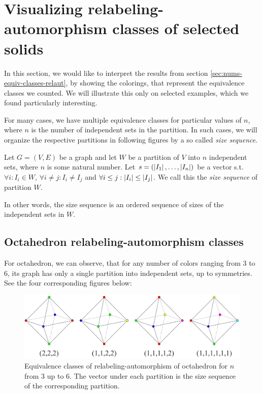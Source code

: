 \section{Visualizing relabeling-automorphism classes of selected solids}\label{sec:relaut-classes-visualisations}

In this section, we would like to interpret the results from section \ref{sec:nums-equiv-classes-relaut}, by showing the colorings, that represent the equivalence classes we counted. We will illustrate this only on selected examples, which we found particularly interesting.

For many cases, we have multiple equivalence classes for particular values of $n$, where $n$ is the number of independent sets in the partition. In such cases, we will organize the respective partitions in following figures by a so called \textit{size sequence}.

\begin{defn}
    Let $G=(V,E)$ be a graph and let $W$ be a partition of $V$ into $n$ independent sets, where $n$ is some natural number. Let $s=(\left|{I_1}\right|, \ldots, \left|{I_n}\right|)$ be a vector s.t. $\forall i: I_i \in W$, $\forall i \neq j: I_i \neq I_j$ and $\forall i \leq j : \left|{I_i}\right| \leq \left|{I_j}\right|$. We call this the \emph{size sequence} of partition $W$.
\end{defn}

In other words, the size sequence is an ordered sequence of sizes of the independent sets in $W$.

\subsection{Octahedron relabeling-automorphism classes}

For octahedron, we can observe, that for any number of colors ranging from $3$ to $6$, its graph has only a single partition into independent sets, up to symmetries. See the four corresponding figures below:

\begin{figure}[H]
    \centering
    \includegraphics[width=1\textwidth]{Resources/Figs/octahedron-relaut-classes.pdf}
    \caption{Equivalence classes of relabeling-automorphism of octahedron for $n$ from $3$ up to $6$. The vector under each partition is the size sequence of the corresponding partition.}
    \label{fig:octahedron-relaut-classes}
\end{figure}

